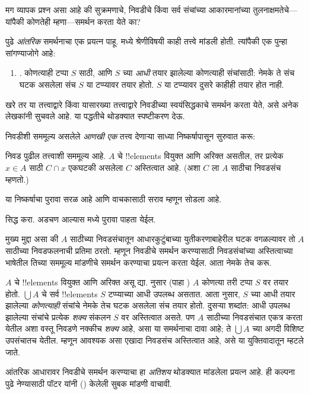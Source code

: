 \documentclass[../../../include/open-logic-section]{subfiles}
\begin{document}

मग व्यापक प्रश्न असा आहे की सुक्रमणाचे, निवडीचे किंवा सर्व संचांच्या आकारमानांच्या तुलनाक्षमतेचे---यांपैकी कोणतेही म्हणा---समर्थन करता येते का?

पुढे \emph{आंतरिक} समर्थनाचा एक प्रयत्न पाहू.  मध्ये श्रेणीविषयी काही तत्त्वे मांडली होती. त्यांपैकी एक पुन्हा सांगण्याजोगे आहे:
\begin{enumerate}
	\item[] \stagesacc. कोणत्याही टप्पा $S$ साठी, आणि $S$ च्या \emph{आधी} तयार झालेल्या कोणत्याही संचांसाठी: नेमके ते संच घटक असलेला संच $S$ या टप्प्यावर तयार होतो. $S$ या टप्प्यावर दुसरे काहीही तयार होत नाही.
\end{enumerate}
खरे तर या तत्त्वाद्वारे किंवा यासारख्या तत्त्वाद्वारे निवडीच्या स्वयंसिद्धकाचे समर्थन करता येते, असे अनेक लेखकांनी सुचवले आहे. या पद्धतीचे थोडक्यात स्पष्टीकरण देऊ.

निवडीशी सममूल्य असलेले \emph{आणखी एक} तत्त्व देणाऱ्या साध्या निष्कर्षापासून सुरुवात करू:

\begin{thm}[$\ZF$ मध्ये]
निवड पुढील तत्त्वाशी सममूल्य आहे. $A$ चे !!{element}s वियुक्त आणि अरिक्त असतील, तर प्रत्येक $x \in A$ साठी $C
\cap x$ एकघटकी असलेला $C$ अस्तित्वात आहे. (अशा $C$ ला $A$ साठीचा {निवडसंच} म्हणतो.)
\end{thm}

या निष्कर्षाचा पुरावा सरळ आहे आणि वाचकासाठी सराव म्हणून सोडला आहे.

\begin{prob}
 सिद्ध करा. अडचण आल्यास \cite[पृ.~242--3]{Potter2004} मध्ये पुरावा पाहता येईल.
\end{prob}

मुख्य मुद्दा असा की $A$ साठीच्या निवडसंचातून आधारकुटुंबाच्या युतीकरणाबाहेरील घटक वगळल्यावर तो $A$ साठीच्या निवडफलनाची प्रतिमा ठरतो. म्हणून निवडीचे समर्थन करण्यासाठी निवडसंचांच्या अस्तित्वाच्या भाषेतील तिच्या सममूल्य मांडणीचे समर्थन करण्याचा प्रयत्न करता येईल. आता नेमके तेच करू.

$A$ चे !!{element}s वियुक्त आणि अरिक्त असू द्या. \stageshier{} नुसार (पाहा ) $A$ कोणत्या तरी टप्पा $S$ वर तयार होतो. $\bigcup A$ चे सर्व !!{element}s $S$ टप्प्याच्या आधी उपलब्ध असतात. आता \stagesacc{} नुसार, $S$ च्या आधी तयार झालेल्या \emph{कोणत्याही} संचांचे नेमके तेच घटक असलेला संच तयार होतो. दुसऱ्या शब्दांत: आधी उपलब्ध झालेल्या संचांचे प्रत्येक \emph{शक्य} संकलन $S$ वर अस्तित्वात असते. पण $A$ साठीच्या निवडसंचात एकत्र करता येतील अशा वस्तू निवडणे नक्कीच \emph{शक्य} आहे, असा या समर्थनाचा दावा आहे; ते $\bigcup A$ च्या अगदी विशिष्ट उपसंचातच येतील. म्हणून आवश्यक असा एखादा निवडसंच अस्तित्वात आहे, असे या युक्तिवादातून म्हटले जाते.

आंतरिक आधारावर निवडीचे समर्थन करण्याचा हा \emph{अतिशय} थोडक्यात मांडलेला प्रयत्न आहे. ही कल्पना पुढे नेण्यासाठी पॉटर यांनी (\citeyear[\S14.8]{Potter2004}) केलेली सुबक मांडणी वाचावी.
\end{document}
